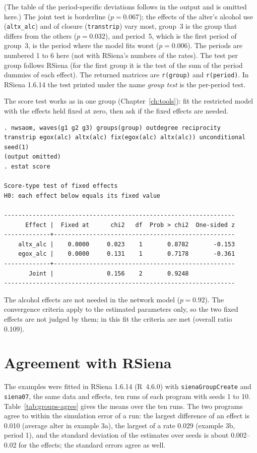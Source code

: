 (The table of the period-specific deviations follows in the output and is omitted here.) The joint test is borderline ($p=0.067$); the effects of the alter's alcohol use (\texttt{altx\_alc}) and of closure (\texttt{transtrip}) vary most, group~3 is the group that differs from the others ($p=0.032$), and period~5, which is the first period of group~3, is the period where the model fits worst ($p=0.006$). The periods are numbered 1 to 6 here (not with RSiena's numbers of the rates). The test per group follows RSiena (for the first group it is the test of the sum of the period dummies of each effect). The returned matrices are \texttt{r(group)} and \texttt{r(period)}. In RSiena 1.6.14 the test printed under the name \emph{group test} is the per-period test.

The score test works as in one group (Chapter~\ref{ch:tools}): fit the restricted model with the effects held fixed at zero, then ask if the fixed effects are needed.
\begin{lstlisting}
. nwsaom, waves(g1 g2 g3) groups(group) outdegree reciprocity transtrip egox(alc) altx(alc) fix(egox(alc) altx(alc)) unconditional seed(1)
(output omitted)
. estat score

Score-type test of fixed effects
H0: each effect below equals its fixed value

-----------------------------------------------------------------
      Effect |  Fixed at      chi2   df  Prob > chi2  One-sided z
-------------+---------------------------------------------------
    altx_alc |    0.0000     0.023    1       0.8782       -0.153
    egox_alc |    0.0000     0.131    1       0.7178       -0.361
-------------+---------------------------------------------------
       Joint |               0.156    2       0.9248
-----------------------------------------------------------------
\end{lstlisting}
The alcohol effects are not needed in the network model ($p=0.92$). The convergence criteria apply to the estimated parameters only, so the two fixed effects are not judged by them; in this fit the criteria are met (overall ratio 0.109).

\section{Agreement with RSiena}\label{sec:groups-rsiena}

The examples were fitted in RSiena 1.6.14 (R~4.6.0) with \texttt{sienaGroupCreate} and \texttt{siena07}, the same data and effects, ten runs of each program with seeds 1 to 10. Table~\ref{tab:groups-agree} gives the means over the ten runs. The two programs agree to within the simulation error of a run: the largest difference of an effect is 0.010 (average alter in example 3a), the largest of a rate 0.029 (example 3b, period 1), and the standard deviation of the estimates over seeds is about 0.002--0.02 for the effects; the standard errors agree as well.

